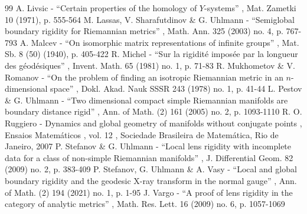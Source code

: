 \documentclass[10pt]{amsart}
\theoremstyle{definition}
\renewcommand{\>}{{\rangle}}
\newcommand{\<}{{\langle}}
\begin{document}
\begin{thebibliography}{99}
 A. Livsic - “Certain properties of the homology of $Y$-systems” , Mat. Zametki 10 (1971), p. 555-564
 M. Lassas, V. Sharafutdinov \& G. Uhlmann - “Semiglobal boundary rigidity for Riemannian metrics” , Math. Ann. 325 (2003) no. 4, p. 767-793
 A. Malcev - “On isomorphic matrix representations of infinite groups” , Mat. Sb. 8 (50) (1940), p. 405-422
 R. Michel - “Sur la rigidité imposée par la longueur des géodésiques” , Invent. Math. 65 (1981) no. 1, p. 71-83
 R. Mukhometov \& V. Romanov - “On the problem of finding an isotropic Riemannian metric in an $n$-dimensional space” , Dokl. Akad. Nauk SSSR 243 (1978) no. 1, p. 41-44
 L. Pestov \& G. Uhlmann - “Two dimensional compact simple Riemannian manifolds are boundary distance rigid” , Ann. of Math. (2) 161 (2005) no. 2, p. 1093-1110
 R. O. Ruggiero - Dynamics and global geometry of manifolds without conjugate points , Ensaios Matemáticos , vol. 12 , Sociedade Brasileira de Matemática, Rio de Janeiro, 2007
 P. Stefanov \& G. Uhlmann - “Local lens rigidity with incomplete data for a class of non-simple Riemannian manifolds” , J. Differential Geom. 82 (2009) no. 2, p. 383-409
 P. Stefanov, G. Uhlmann \& A. Vasy - “Local and global boundary rigidity and the geodesic X-ray transform in the normal gauge” , Ann. of Math. (2) 194 (2021) no. 1, p. 1-95
 J. Vargo - “A proof of lens rigidity in the category of analytic metrics” , Math. Res. Lett. 16 (2009) no. 6, p. 1057-1069
\end{thebibliography}
\end{document}
